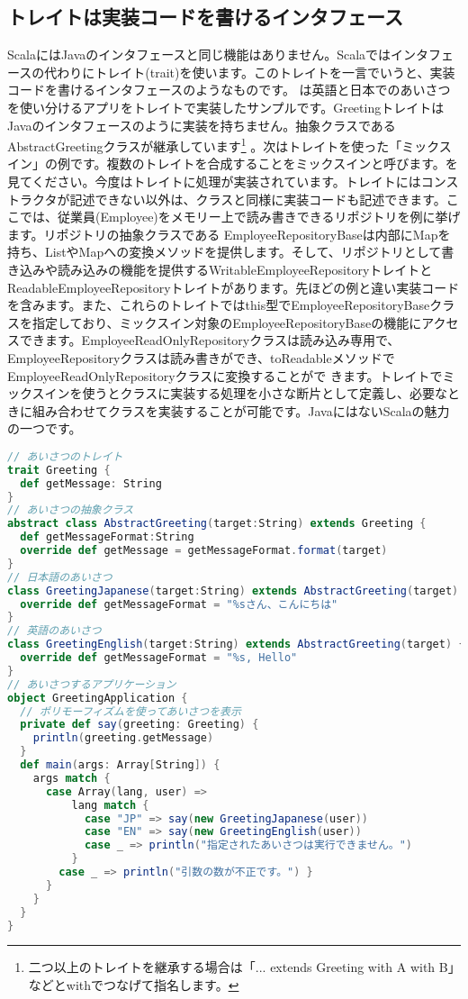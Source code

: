 \subsection{トレイトは実装コードを書けるインタフェース}
ScalaにはJavaのインタフェースと同じ機能はありません。Scalaではインタフェースの代わりにトレイト(trait)を使います。このトレイトを一言でいうと、実装コードを書けるインタフェースのようなものです。 は英語と日本でのあいさつを使い分けるアプリをトレイトで実装したサンプルです。GreetingトレイトはJavaのインタフェースのように実装を持ちません。抽象クラスであるAbstractGreetingクラスが継承しています\footnote{二つ以上のトレイトを継承する場合は「... extends Greeting with A with B」 などとwithでつなげて指名します。} 。次はトレイトを使った「ミックスイン」の例です。複数のトレイトを合成することをミックスインと呼びます。を見てください。今度はトレイトに処理が実装されています。トレイトにはコンストラクタが記述できない以外は、クラスと同様に実装コードも記述できます。ここでは、従業員(Employee)をメモリー上で読み書きできるリポジトリを例に挙げます。リポジトリの抽象クラスである EmployeeRepositoryBaseは内部にMapを持ち、ListやMapへの変換メソッドを提供します。そして、リポジトリとして書き込みや読み込みの機能を提供するWritableEmployeeRepositoryトレイトとReadableEmployeeRepositoryトレイトがあります。先ほどの例と違い実装コードを含みます。また、これらのトレイトではthis型でEmployeeRepositoryBaseクラスを指定しており、ミックスイン対象のEmployeeRepositoryBaseの機能にアクセスできます。EmployeeReadOnlyRepositoryクラスは読み込み専用で、EmployeeRepositoryクラスは読み書きができ、toReadableメソッドでEmployeeReadOnlyRepositoryクラスに変換することがで きます。トレイトでミックスインを使うとクラスに実装する処理を小さな断片として定義し、必要なときに組み合わせてクラスを実装することが可能です。JavaにはないScalaの魅力の一つです。 

\begin{lstlisting}[language=scala, label=src:trait, caption=トレイトの利用例。ScalaにはJavaのinterfaceに相当する機能はなく、トレイトを使用する]
// あいさつのトレイト
trait Greeting {
  def getMessage: String
}
// あいさつの抽象クラス
abstract class AbstractGreeting(target:String) extends Greeting {
  def getMessageFormat:String
  override def getMessage = getMessageFormat.format(target)
}
// 日本語のあいさつ
class GreetingJapanese(target:String) extends AbstractGreeting(target) {
  override def getMessageFormat = "%sさん、こんにちは"
}
// 英語のあいさつ
class GreetingEnglish(target:String) extends AbstractGreeting(target) {
  override def getMessageFormat = "%s, Hello"
}
// あいさつするアプリケーション
object GreetingApplication {
  // ポリモーフィズムを使ってあいさつを表示
  private def say(greeting: Greeting) {
    println(greeting.getMessage)
  }
  def main(args: Array[String]) {
    args match {
      case Array(lang, user) =>
          lang match {
            case "JP" => say(new GreetingJapanese(user))
            case "EN" => say(new GreetingEnglish(user))
            case _ => println("指定されたあいさつは実行できません。")
          }
        case _ => println("引数の数が不正です。") }
      }
    }
  }
}
\end{lstlisting}

